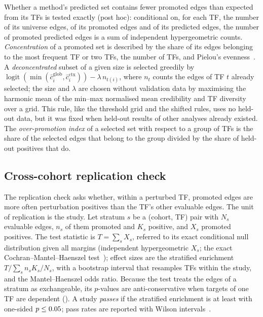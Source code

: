 Whether a method's predicted set contains fewer promoted edges than expected from its TFs is tested exactly (post hoc): conditional on, for each TF, the number of its universe edges, of its promoted edges and of its predicted edges, the number of promoted predicted edges is a sum of independent hypergeometric counts.
\emph{Concentration} of a promoted set is described by the share of its edges belonging to the most frequent TF or two TFs, the number of TFs, and Pielou's evenness~\citep{pielou1966measurement}. A \emph{deconcentrated} subset of a given size is selected greedily by $\operatorname{logit}(\min(\bar c_i^{\mathrm{glob}},\bar c_i^{\mathrm{ctx}}))-\lambda\, n_{t(i)}$, where $n_t$ counts the edges of TF $t$ already selected; the size and $\lambda$ are chosen without validation data by maximising the harmonic mean of the min--max normalised mean credibility and TF diversity over a grid. This rule, like the threshold grid and the shifted rules, uses no held-out data, but it was fixed when held-out results of other analyses already existed.
The \emph{over-promotion index} of a selected set with respect to a group of TFs is the share of the selected edges that belong to the group divided by the share of held-out positives that do.

\subsection{Cross-cohort replication check}\label{sec:replication}
The replication check asks whether, within a perturbed TF, promoted edges are more often perturbation positives than the TF's other evaluable edges.
The unit of replication is the study.
Let stratum $s$ be a (cohort, TF) pair with $N_s$ evaluable edges, $n_s$ of them promoted and $K_s$ positive, and $X_s$ promoted positives.
The test statistic is $T=\sum_s X_s$, referred to its exact conditional null distribution given all margins (independent hypergeometric $X_s$; the exact Cochran--Mantel--Haenszel test~\citep{mantel1959statistical}); effect sizes are the stratified enrichment $T/\sum_s n_sK_s/N_s$, with a bootstrap interval that resamples TFs within the study, and the Mantel--Haenszel odds ratio.
Because the test treats the edges of a stratum as exchangeable, its $p$-values are anti-conservative when targets of one TF are dependent ().
A study \emph{passes} if the stratified enrichment is at least \nRepEndpoint{} with one-sided $p\le0.05{}$; pass rates are reported with Wilson intervals~\citep{wilson1927probable}.

